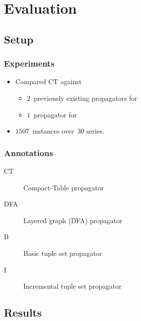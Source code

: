 \documentclass{beamer}
\newcommand{\Table}{\Constraint{Table}}
\begin{document}
\section{Evaluation}
\subsection{Setup}

\begin{frame}
  \frametitle{Experiments}
  
  \begin{itemize}
    \item   Compared CT against
      \begin{itemize}
      \item $2$~previously existing propagators for \Table
      \item $1$~propagator for 
      \end{itemize}
    \item     $1507$~instances over~$30$ series.
  \end{itemize}
\end{frame}

\begin{frame}
  \frametitle{Annotations}
    \begin{description}
    \item[CT] Compact-Table propagator
    \item[DFA] Layered graph (DFA) propagator%
    \item[B] Basic tuple set propagator%
    \item[I] Incremental tuple set propagator
  \end{description}
\end{frame}

\subsection{Results}
\end{document}
